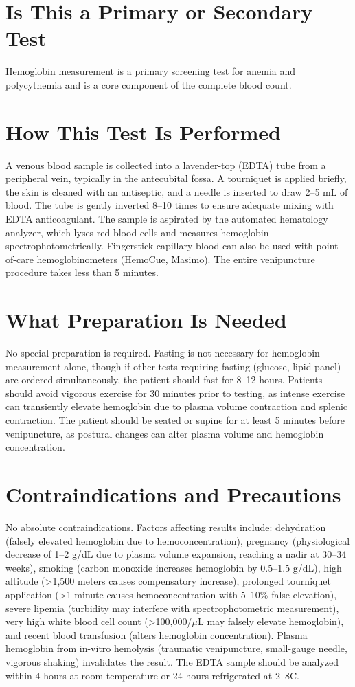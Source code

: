 \section*{Is This a Primary or Secondary Test}
Hemoglobin measurement is a primary screening test for anemia and polycythemia and is a core component of the complete blood count.

\section*{How This Test Is Performed}
A venous blood sample is collected into a lavender-top (EDTA) tube from a peripheral vein, typically in the antecubital fossa. A tourniquet is applied briefly, the skin is cleaned with an antiseptic, and a needle is inserted to draw 2--5 mL of blood. The tube is gently inverted 8--10 times to ensure adequate mixing with EDTA anticoagulant. The sample is aspirated by the automated hematology analyzer, which lyses red blood cells and measures hemoglobin spectrophotometrically. Fingerstick capillary blood can also be used with point-of-care hemoglobinometers (HemoCue, Masimo). The entire venipuncture procedure takes less than 5 minutes.

\section*{What Preparation Is Needed}
No special preparation is required. Fasting is not necessary for hemoglobin measurement alone, though if other tests requiring fasting (glucose, lipid panel) are ordered simultaneously, the patient should fast for 8--12 hours. Patients should avoid vigorous exercise for 30 minutes prior to testing, as intense exercise can transiently elevate hemoglobin due to plasma volume contraction and splenic contraction. The patient should be seated or supine for at least 5 minutes before venipuncture, as postural changes can alter plasma volume and hemoglobin concentration.

\section*{Contraindications and Precautions}
No absolute contraindications. Factors affecting results include: dehydration (falsely elevated hemoglobin due to hemoconcentration), pregnancy (physiological decrease of 1--2 g/dL due to plasma volume expansion, reaching a nadir at 30--34 weeks), smoking (carbon monoxide increases hemoglobin by 0.5--1.5 g/dL), high altitude (>1,500 meters causes compensatory increase), prolonged tourniquet application (>1 minute causes hemoconcentration with 5--10\% false elevation), severe lipemia (turbidity may interfere with spectrophotometric measurement), very high white blood cell count (>100,000/$\mu$L may falsely elevate hemoglobin), and recent blood transfusion (alters hemoglobin concentration). Plasma hemoglobin from in-vitro hemolysis (traumatic venipuncture, small-gauge needle, vigorous shaking) invalidates the result. The EDTA sample should be analyzed within 4 hours at room temperature or 24 hours refrigerated at 2--8\textdegree{}C.

